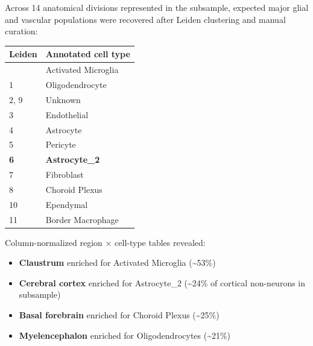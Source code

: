 \documentclass[
  11pt,
]{article}
\newcounter{none} %
\providecommand{\tightlist}{%
  \setlength{\itemsep}{0pt}\setlength{\parskip}{0pt}}
\begin{document}
Across 14 anatomical divisions represented in the subsample, expected
major glial and vascular populations were recovered after Leiden
clustering and manual curation:

{\def\LTcaptype{none} %
\begin{longtable}[]{@{}ll@{}}
\toprule\noalign{}
Leiden & Annotated cell type \\
\midrule\noalign{}
\endhead
\bottomrule\noalign{}
\endlastfoot
0 & Activated Microglia \\
1 & Oligodendrocyte \\
2, 9 & Unknown \\
3 & Endothelial \\
4 & Astrocyte \\
5 & Pericyte \\
\textbf{6} & \textbf{Astrocyte\_2} \\
7 & Fibroblast \\
8 & Choroid Plexus \\
10 & Ependymal \\
11 & Border Macrophage \\
\end{longtable}
}

\begin{tcolorbox}[enhanced jigsaw, arc=.35mm, bottomrule=.15mm, bottomtitle=1mm, breakable, colback=white, colbacktitle=quarto-callout-tip-color!10!white, colframe=quarto-callout-tip-color-frame, coltitle=black, left=2mm, leftrule=.75mm, opacityback=0, opacitybacktitle=0.6, rightrule=.15mm, title=\textcolor{quarto-callout-tip-color}{\faLightbulb}\hspace{0.5em}{Regional pattern (Research Question 1)}, titlerule=0mm, toprule=.15mm, toptitle=1mm]

Column-normalized region × cell-type tables revealed:

\begin{itemize}
\tightlist
\item
  \textbf{Claustrum} enriched for Activated Microglia
  (\textasciitilde53\%)
\item
  \textbf{Cerebral cortex} enriched for Astrocyte\_2
  (\textasciitilde24\% of cortical non-neurons in subsample)
\item
  \textbf{Basal forebrain} enriched for Choroid Plexus
  (\textasciitilde25\%)
\item
  \textbf{Myelencephalon} enriched for Oligodendrocytes
  (\textasciitilde21\%)
\end{itemize}

\end{tcolorbox}
\end{document}
